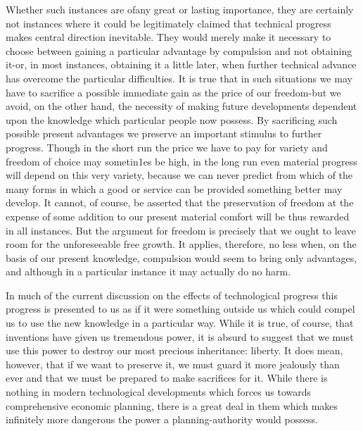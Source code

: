 \documentclass[11pt,openany]{book}
\begin{document}
Whether such instances are ofany great or lasting importance, they are certainly not instances where it could be legitimately claimed that technical progress makes central direction inevitable. They would merely make it necessary to choose between gaining a particular advantage by compulsion and not obtaining it-or, in most instances, obtaining it a little later, when further technical advance has overcome the particular difficulties. It is true that in such situations we may have to sacrifice a possible immediate gain as the price of our freedom-but we avoid, on the other hand, the necessity of making future developments dependent upon the knowledge which particular people now possess. By sacrificing such possible present advantages we preserve an important stimulus to further progress. Though in the short run the price we have to pay for variety and freedom of choice may sometin1es be high, in the long run even material progress will depend on this very variety, because we can never predict from which of the many forms in which a good or service can be provided something better may develop. It cannot, of course, be asserted that the preservation of freedom at the expense of some addition to our present material comfort will be thus rewarded in all instances. But the argument for freedom is precisely that we ought to leave room for the unforeseeable free growth. It applies, therefore, no less when, on the basis of our present knowledge, compulsion would seem to bring only advantages, and although in a particular instance it may actually do no harm.

In much of the current discussion on the effects of technological progress this progress is presented to us as if it were something outside us which could compel us to use the new knowledge in a particular way. While it is true, of course, that inventions have given us tremendous power, it is absurd to suggest that we must use this power to destroy our most precious inheritance: liberty. It does mean, however, that if we want to preserve it, we must guard it more jealously than ever and that we must be prepared to make sacrifices for it. While there is nothing in modern technological developments which forces us towards comprehensive economic planning, there is a great deal in them which makes infinitely more dangerous the power a planning-authority would possess.

\begin{center}\textasteriskcentered\hspace{0.9em}\textasteriskcentered\hspace{0.9em}\textasteriskcentered\end{center}
\end{document}
